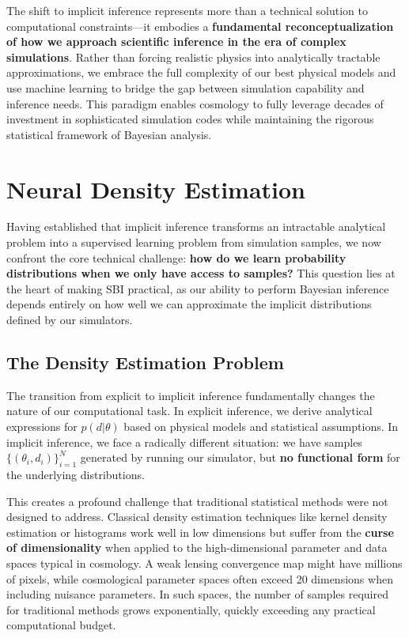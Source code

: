 \documentclass{SciPost}
\begin{document}
\bigskip

The shift to implicit inference represents more than a technical solution to computational constraints—it embodies a \textbf{fundamental reconceptualization of how we approach scientific inference in the era of complex simulations}. Rather than forcing realistic physics into analytically tractable approximations, we embrace the full complexity of our best physical models and use machine learning to bridge the gap between simulation capability and inference needs. This paradigm enables cosmology to fully leverage decades of investment in sophisticated simulation codes while maintaining the rigorous statistical framework of Bayesian analysis.

\section{Neural Density Estimation}

Having established that implicit inference transforms an intractable analytical problem into a supervised learning problem from simulation samples, we now confront the core technical challenge: \textbf{how do we learn probability distributions when we only have access to samples?} This question lies at the heart of making SBI practical, as our ability to perform Bayesian inference depends entirely on how well we can approximate the implicit distributions defined by our simulators.

\subsection{The Density Estimation Problem}

The transition from explicit to implicit inference fundamentally changes the nature of our computational task. In explicit inference, we derive analytical expressions for $p(d|\theta)$ based on physical models and statistical assumptions. In implicit inference, we face a radically different situation: we have samples $\{(\theta_i, d_i)\}_{i=1}^N$ generated by running our simulator, but \textbf{no functional form} for the underlying distributions.

This creates a profound challenge that traditional statistical methods were not designed to address. Classical density estimation techniques like kernel density estimation or histograms work well in low dimensions but suffer from the \textbf{curse of dimensionality} when applied to the high-dimensional parameter and data spaces typical in cosmology. A weak lensing convergence map might have millions of pixels, while cosmological parameter spaces often exceed 20 dimensions when including nuisance parameters. In such spaces, the number of samples required for traditional methods grows exponentially, quickly exceeding any practical computational budget.
\end{document}
